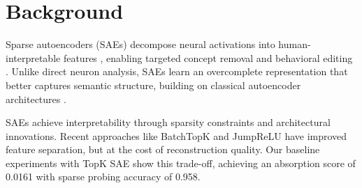 \documentclass{article} %
\begin{document}






\section{Background}
\label{sec:background}

Sparse autoencoders (SAEs) decompose neural activations into human-interpretable features \cite{gaoScalingEvaluatingSparse}, enabling targeted concept removal \cite{farrellApplyingSparseAutoencoders2024} and behavioral editing \cite{marksSparseFeatureCircuits2024}. Unlike direct neuron analysis, SAEs learn an overcomplete representation that better captures semantic structure, building on classical autoencoder architectures \cite{goodfellow2016deep}.

SAEs achieve interpretability through sparsity constraints and architectural innovations. Recent approaches like BatchTopK \cite{bussmannBatchTopKSparseAutoencoders2024} and JumpReLU \cite{rajamanoharanJumpingAheadImproving2024} have improved feature separation, but at the cost of reconstruction quality. Our baseline experiments with TopK SAE show this trade-off, achieving an absorption score of 0.0161 with sparse probing accuracy of 0.958.
\end{document}
